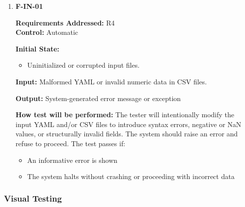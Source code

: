\documentclass[12pt, titlepage]{article}
\begin{document}
\begin{enumerate}

\item{\textbf{F-IN-01}}

\textbf{Requirements Addressed:} R4\\
\textbf{Control:} Automatic
					
\textbf{Initial State: }
\begin{itemize}
  \item Uninitialized or corrupted input files.
\end{itemize}
					
\textbf{Input:} Malformed YAML or invalid numeric data in CSV files.

\textbf{Output:} System-generated error message or exception
					
\textbf{How test will be performed:} The tester will intentionally modify the input YAML and/or CSV files to introduce syntax errors, negative or NaN values, or structurally invalid fields. The system should raise an error and refuse to proceed. The test passes if:
\begin{itemize}
  \item An informative error is shown
  \item The system halts without crashing or proceeding with incorrect data
\end{itemize}

\end{enumerate}

\subsubsection{Visual Testing}
\end{document}

